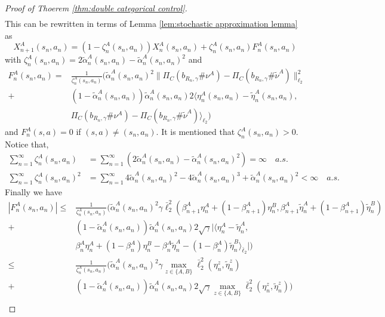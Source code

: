 \documentclass{article}
\theoremstyle{plain}
\theoremstyle{definition}
\theoremstyle{remark}
\begin{document}
\begin{proof}[Proof of Thoerem \ref{thm:double categorical control}]
\begin{align*}
    \end{align*}
    This can be rewritten in terms of Lemma \ref{lem:stochastic approximation lemma} as
    \[X_{n+1}^A(s_n,a_n)= (1-\zeta_n^A(s_n,a_n))X_{n}^A(s_n,a_n)+\zeta_n^A(s_n,a_n)F^A_n(s_n,a_n) \]
    with $ \zeta_n^A(s_n,a_n)=2\tilde\alpha^A_n(s_n,a_n)-\tilde\alpha^A_n(s_n,a_n)^2$ and
    \begin{align*}
    F^A_n(s_n,a_n)=&\frac{1}{\zeta_n^A(s_n,a_n)}({\tilde\alpha^A_n}(s_n,a_n)^2\|\Pi_C(b_{R_n,\gamma}\#\nu^A)-\Pi_C(b_{R_n,\gamma}\#\tilde\nu^A)\|_{\ell_2}^2\\
    +&(1-\tilde\alpha^A_n(s_n,a_n))\tilde\alpha^A_n(s_n,a_n)2\langle\eta^A_{n}(s_n,a_n)-\tilde\eta^A_{n}(s_n,a_n),\\
    &\Pi_C(b_{R_n,\gamma}\#\nu^A)-\Pi_C(b_{R_n,\gamma}\#\tilde\nu^A)\rangle_{\ell_2})
    \end{align*}
    and $F_n^A(s,a)=0$ if $(s,a)\neq(s_n,a_n).$ It is mentioned that $\zeta_n^A(s_n,a_n)>0.$
    Notice that,
    \begin{equation}\label{eq:zeta}
    \begin{aligned}
                \sum_{n=1}^\infty\zeta_n^A(s_n,a_n)&=\sum_{n=1}^\infty (2\tilde\alpha^A_n(s_n,a_n)-\tilde\alpha^A_n(s_n,a_n)^2)=\infty\quad a.s.\\
        \sum_{n=1}^\infty\zeta_n^A(s_n,a_n)^2&=\sum_{n=1}^\infty4 \tilde\alpha^A_n(s_n,a_n)^2 - 4 \tilde\alpha^A_n(s_n,a_n)^3 + \tilde\alpha^A_n(s_n,a_n)^2<\infty \quad a.s.
    \end{aligned}
    \end{equation}
    Finally we have
    \begin{align*}
        |F^A_n(s_n,a_n)|\leq&\frac{1}{\zeta_n^A(s_n,a_n)}({\tilde\alpha^A_n}(s_n,a_n)^2\gamma\bar\ell^2_2(\beta^A_{n+1}\eta^A_n
    +(1-\beta^A_{n+1})\eta^B_n,\beta^A_{n+1}\tilde\eta^A_n
    +(1-\beta^A_{n+1})\tilde\eta^B_n)\\
    +&(1-\tilde\alpha^A_n(s_n,a_n))\tilde\alpha^A_n(s_n,a_n)2\sqrt{\gamma}|\langle\eta^A_{n}-\tilde\eta^A_{n},\\
    &\beta^A_n\eta^A_n
    +(1-\beta^A_n)\eta^B_n-\beta^A_n\tilde\eta^A_n
    -(1-\beta^A_n)\tilde\eta^B_n\rangle_{\bar\ell_2}|)\\
    \leq&\frac{1}{\zeta_n^A(s_n,a_n)}({\tilde\alpha^A_n}(s_n,a_n)^2\gamma\max_{z\in\{A,B\}}\bar\ell^2_2(\eta^z_{n},\tilde\eta^z_{n})\\
    +&(1-\tilde\alpha^A_n(s_n,a_n))\tilde\alpha^A_n(s_n,a_n)2\sqrt{\gamma}\max_{z\in\{A,B\}}\bar\ell^2_2(\eta^z_{n},\tilde\eta^z_{n}))\\

\end{align*}
\end{proof}
\end{document}
